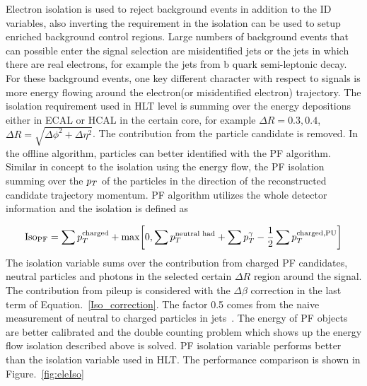 Electron isolation is used to reject background events in addition to the ID variables, also inverting the requirement in the isolation can be used to setup enriched background control regions. Large numbers of background events that can possible enter the signal selection are misidentified jets or the jets in which there are real electrons, for example the jets from b quark semi-leptonic decay. For these background events, one key different character with respect to signals is more energy flowing around the electron(or misidentified electron) trajectory. The isolation requirement used in HLT level is summing over the energy depositions either in ECAL or HCAL in the certain core, for example $\Delta R=0.3,0.4$, $\Delta R=\sqrt{\Delta \phi^{2}+\Delta\eta^{2}}$. The contribution from the particle candidate is removed. In the offline algorithm, particles can better identified with the PF algorithm. Similar in concept to the isolation using the energy flow, the PF isolation summing over the $p_{T}$ of the particles in the direction of the reconstructed candidate trajectory momentum. PF algorithm utilizes the whole detector information and the isolation is defined as



\begin{equation}\label{Iso_correction}
\textrm{Iso}_{\textrm{PF}}=\sum p_{T}^{\textrm{charged}}+\textrm{max}\bigg[ 0,\sum p_{T}^{\textrm{neutral~had}} +\sum p_{T}^{\gamma}-\frac{1}{2}\sum p_{T}^{\textrm{charged,PU}}\bigg]
\end{equation}
The isolation variable sums over the contribution from charged PF candidates, neutral particles and photons in the selected certain $\Delta R$ region around the signal. The contribution from pileup is considered with the $\Delta \beta$ correction in the last term of Equation.~\ref{Iso_correction}. The factor 0.5 comes from the naive measurement of neutral to charged particles in jets~\cite{FastJetalso}. The energy of PF objects are better calibrated and the double counting problem which shows up the energy flow isolation described above is solved. PF isolation variable performs better than the isolation variable used in HLT. The performance comparison is shown in Figure.~\ref{fig:eleIso}

